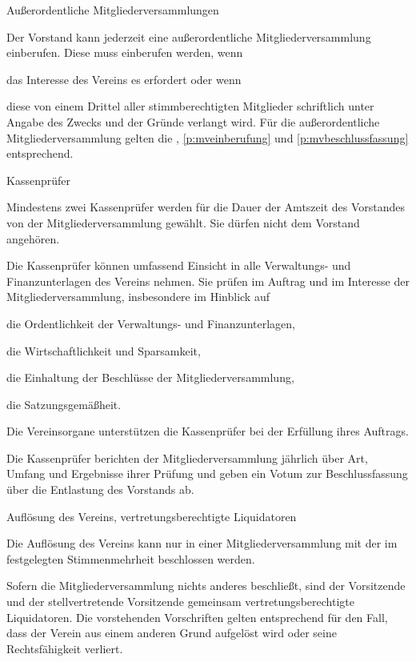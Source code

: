 \documentclass[11pt,a4paper,twoside,openany,article]{memoir}
\begin{document}
\begin{para}{Außerordentliche Mitgliederversammlungen}
	\label{p:mvaußerordentlich}
	\item Der Vorstand kann jederzeit eine außerordentliche Mitgliederversammlung einberufen. Diese muss einberufen werden, wenn
	\begin{subpara}
		\item das Interesse des Vereins es erfordert oder wenn
		\item diese von einem Drittel aller stimmberechtigten Mitglieder schriftlich unter Angabe des Zwecks und der Gründe verlangt wird.
		Für die außerordentliche Mitgliederversammlung gelten die , \ref{p:mveinberufung} und \ref{p:mvbeschlussfassung} entsprechend.
	\end{subpara}
\end{para}

\begin{para}{Kassenprüfer}
	\label{p:kassenprüfer}
	\item Mindestens zwei Kassenprüfer werden für die Dauer der Amtszeit des Vorstandes von der Mitgliederversammlung gewählt. Sie dürfen nicht dem Vorstand angehören.
	\item Die Kassenprüfer können umfassend Einsicht in alle Verwaltungs- und Finanzunterlagen des Vereins nehmen. Sie prüfen im Auftrag und im Interesse der Mitgliederversammlung, insbesondere im Hinblick auf
	\begin{subpara}
		\item die Ordentlichkeit der Verwaltungs- und Finanzunterlagen,
		\item die Wirtschaftlichkeit und Sparsamkeit,
		\item die Einhaltung der Beschlüsse der Mitgliederversammlung,
		\item die Satzungsgemäßheit.
	\end{subpara}
	\item Die Vereinsorgane unterstützen die Kassenprüfer bei der Erfüllung ihres Auftrags.
	\item Die Kassenprüfer berichten der Mitgliederversammlung jährlich über Art, Umfang und Ergebnisse ihrer Prüfung und geben ein Votum zur Beschlussfassung über die Entlastung des Vorstands ab.
\end{para}

\begin{para}{Auflösung des Vereins, vertretungsberechtigte Liquidatoren}
	\label{p:auflösung}
	\item Die Auflösung des Vereins kann nur in einer Mitgliederversammlung mit der im  festgelegten Stimmenmehrheit beschlossen werden.
	\item Sofern die Mitgliederversammlung nichts anderes beschließt, sind der Vorsitzende und der stellvertretende Vorsitzende gemeinsam vertretungs\-be\-rech\-tigte Liquidatoren.
	Die vorstehenden Vorschriften gelten entsprechend für den Fall, dass der Verein aus einem anderen Grund aufgelöst wird oder seine Rechtsfähigkeit verliert.
\end{para}
\end{document}
